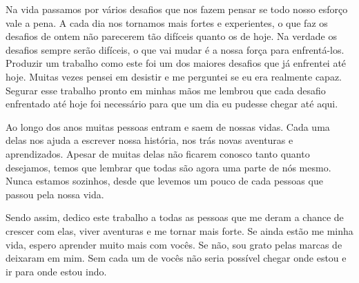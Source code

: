%
%

\begin{dedicatoria}

Na vida passamos por vários desafios que nos fazem pensar se todo nosso esforço vale a pena. A cada dia nos tornamos mais fortes e experientes, o que faz os desafios de ontem não parecerem tão difíceis quanto os de hoje. Na verdade os desafios sempre serão difíceis, o que vai mudar é a nossa força para enfrentá-los. Produzir um trabalho como este foi um dos maiores desafios que já enfrentei até hoje. Muitas vezes pensei em desistir e me perguntei se eu era realmente capaz. Segurar esse trabalho pronto em minhas mãos me lembrou que cada desafio enfrentado até hoje foi necessário para que um dia eu pudesse chegar até aqui.

Ao longo dos anos muitas pessoas entram e saem de nossas vidas. Cada uma delas nos ajuda a escrever nossa história, nos trás novas aventuras e aprendizados. Apesar de muitas delas não ficarem conosco tanto quanto desejamos, temos que lembrar que todas são agora uma parte de nós mesmo. Nunca estamos sozinhos, desde que levemos um pouco de cada pessoas que passou pela nossa vida.

Sendo assim, dedico este trabalho a todas as pessoas que me deram a chance de crescer com elas, viver aventuras e me tornar mais forte. Se ainda estão me minha vida, espero aprender muito mais com vocês. Se não, sou grato pelas marcas de deixaram em mim. Sem cada um de vocês não seria possível chegar onde estou e ir para onde estou indo.

\end{dedicatoria}
